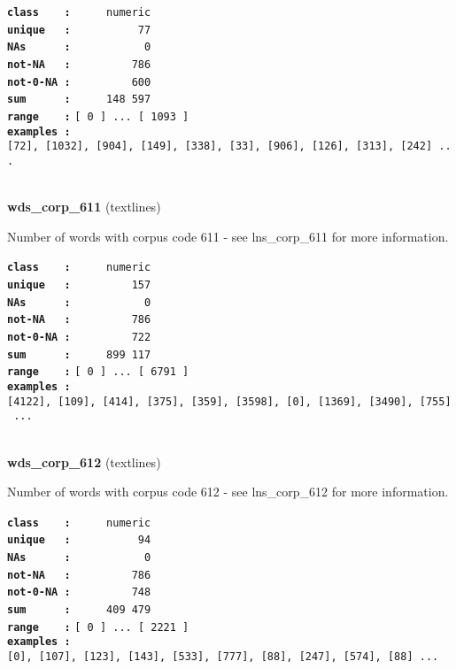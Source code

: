 \documentclass[]{article}
\begin{document}
\textbf{\texttt{class\ \ \ \ :}} \texttt{~~~~~numeric}\\
\textbf{\texttt{unique\ \ \ :}} \texttt{~~~~~~~~~~77}\\
\textbf{\texttt{NAs\ \ \ \ \ \ :}} \texttt{~~~~~~~~~~~0}\\
\textbf{\texttt{not-NA\ \ \ :}} \texttt{~~~~~~~~~786}\\
\textbf{\texttt{not-0-NA\ :}} \texttt{~~~~~~~~~600}\\
\textbf{\texttt{sum\ \ \ \ \ \ :}} \texttt{~~~~~148~597}\\
\textbf{\texttt{range\ \ \ \ :}}
\texttt{{[}\ 0\ {]}\ ...\ {[}\ 1093\ {]}}\\
\textbf{\texttt{examples\ :}}
\texttt{{[}72{]},\ {[}1032{]},\ {[}904{]},\ {[}149{]},\ {[}338{]},\ {[}33{]},\ {[}906{]},\ {[}126{]},\ {[}313{]},\ {[}242{]}\ ...}\\

~

\textbf{wds\_corp\_611} (textlines)

Number of words with corpus code 611 - see lns\_corp\_611 for more
information.

\textbf{\texttt{class\ \ \ \ :}} \texttt{~~~~~numeric}\\
\textbf{\texttt{unique\ \ \ :}} \texttt{~~~~~~~~~157}\\
\textbf{\texttt{NAs\ \ \ \ \ \ :}} \texttt{~~~~~~~~~~~0}\\
\textbf{\texttt{not-NA\ \ \ :}} \texttt{~~~~~~~~~786}\\
\textbf{\texttt{not-0-NA\ :}} \texttt{~~~~~~~~~722}\\
\textbf{\texttt{sum\ \ \ \ \ \ :}} \texttt{~~~~~899~117}\\
\textbf{\texttt{range\ \ \ \ :}}
\texttt{{[}\ 0\ {]}\ ...\ {[}\ 6791\ {]}}\\
\textbf{\texttt{examples\ :}}
\texttt{{[}4122{]},\ {[}109{]},\ {[}414{]},\ {[}375{]},\ {[}359{]},\ {[}3598{]},\ {[}0{]},\ {[}1369{]},\ {[}3490{]},\ {[}755{]}\ ...}\\

~

\textbf{wds\_corp\_612} (textlines)

Number of words with corpus code 612 - see lns\_corp\_612 for more
information.

\textbf{\texttt{class\ \ \ \ :}} \texttt{~~~~~numeric}\\
\textbf{\texttt{unique\ \ \ :}} \texttt{~~~~~~~~~~94}\\
\textbf{\texttt{NAs\ \ \ \ \ \ :}} \texttt{~~~~~~~~~~~0}\\
\textbf{\texttt{not-NA\ \ \ :}} \texttt{~~~~~~~~~786}\\
\textbf{\texttt{not-0-NA\ :}} \texttt{~~~~~~~~~748}\\
\textbf{\texttt{sum\ \ \ \ \ \ :}} \texttt{~~~~~409~479}\\
\textbf{\texttt{range\ \ \ \ :}}
\texttt{{[}\ 0\ {]}\ ...\ {[}\ 2221\ {]}}\\
\textbf{\texttt{examples\ :}}
\texttt{{[}0{]},\ {[}107{]},\ {[}123{]},\ {[}143{]},\ {[}533{]},\ {[}777{]},\ {[}88{]},\ {[}247{]},\ {[}574{]},\ {[}88{]}\ ...}\\
\end{document}

